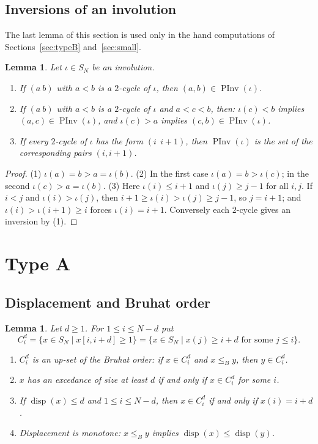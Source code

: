 \documentclass[11pt]{amsart}
\newtheorem{lemma}[theorem]{Lemma}
\theoremstyle{definition}
\theoremstyle{remark}
\numberwithin{equation}{section}
\newcommand{\leB}{\le_B}
\DeclareMathOperator{\disp}{disp}
\DeclareMathOperator{\PInv}{PInv}
\begin{document}
\subsection{Inversions of an involution}
The last lemma of this section is used only in the hand computations of Sections~\ref{sec:typeB} and~\ref{sec:small}.

\begin{lemma}\label{lem:invinv}
Let \(\iota\in S_N\) be an involution.
\begin{enumerate}
\item If \((a\ b)\) with \(a<b\) is a \(2\)-cycle of \(\iota\), then \((a,b)\in\PInv(\iota)\).
\item If \((a\ b)\) with \(a<b\) is a \(2\)-cycle of \(\iota\) and \(a<c<b\), then: \(\iota(c)<b\) implies \((a,c)\in\PInv(\iota)\), and \(\iota(c)>a\) implies \((c,b)\in\PInv(\iota)\).
\item If every \(2\)-cycle of \(\iota\) has the form \((i\ \ i+1)\), then \(\PInv(\iota)\) is the set of the corresponding pairs \((i,i+1)\).
\end{enumerate}
\end{lemma}

\begin{proof}
(1) \(\iota(a)=b>a=\iota(b)\). (2) In the first case \(\iota(a)=b>\iota(c)\); in the second \(\iota(c)>a=\iota(b)\). (3) Here \(\iota(i)\le i+1\) and \(\iota(j)\ge j-1\) for all \(i,j\). If \(i<j\) and \(\iota(i)>\iota(j)\), then \(i+1\ge\iota(i)>\iota(j)\ge j-1\), so \(j=i+1\); and \(\iota(i)>\iota(i+1)\ge i\) forces \(\iota(i)=i+1\). Conversely each \(2\)-cycle gives an inversion by (1).
\end{proof}

\section{Type A}\label{sec:typeA}

\subsection{Displacement and Bruhat order}

\begin{lemma}\label{lem:upset}
Let \(d\ge1\). For \(1\le i\le N-d\) put
\[
C_i^d=\{x\in S_N\mid x[i,i+d]\ge1\}=\{x\in S_N\mid x(j)\ge i+d\text{ for some }j\le i\}.
\]
\begin{enumerate}
\item \(C_i^d\) is an up-set of the Bruhat order: if \(x\in C_i^d\) and \(x\leB y\), then \(y\in C_i^d\).
\item \(x\) has an excedance of size at least \(d\) if and only if \(x\in C_i^d\) for some \(i\).
\item If \(\disp(x)\le d\) and \(1\le i\le N-d\), then \(x\in C_i^d\) if and only if \(x(i)=i+d\).
\item Displacement is monotone: \(x\leB y\) implies \(\disp(x)\le\disp(y)\).
\end{enumerate}
\end{lemma}
\end{document}
